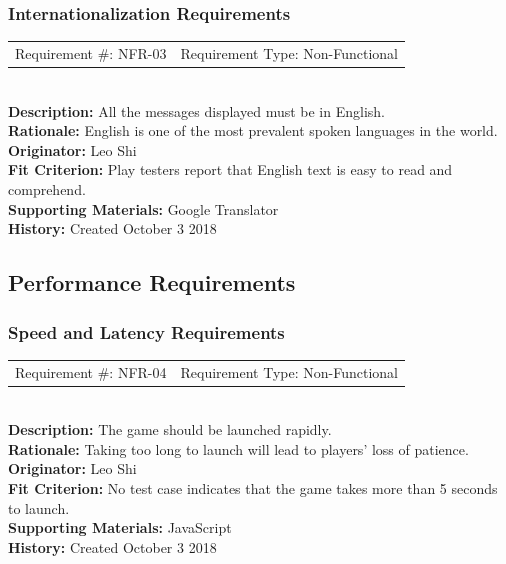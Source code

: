 \documentclass[12pt, titlepage]{article}
\begin{document}
\subsubsection{Internationalization Requirements}
\begin{reqbox}
	\begin{tabular}{cc}
		Requirement \#: NFR-03 & Requirement Type: Non-Functional \\
	\end{tabular} \\
	\textbf{Description:} All the messages displayed must be in English. \\
	\textbf{Rationale:}  English is one of the most prevalent spoken languages in the world.\\
	\textbf{Originator:} Leo Shi\\
	\textbf{Fit Criterion:} Play testers report that English text is easy to read and comprehend. \\
	\textbf{Supporting Materials:} Google Translator \\
	\textbf{History:} Created October 3 2018
\end{reqbox}

\subsection{Performance Requirements}

\subsubsection{Speed and Latency Requirements}
\begin{reqbox}
	\begin{tabular}{cc}
		Requirement \#: NFR-04 & Requirement Type: Non-Functional \\
	\end{tabular} \\
	\textbf{Description:} The game should be launched rapidly. \\
	\textbf{Rationale:}  Taking too long to launch will lead to players' loss of patience.\\
	\textbf{Originator:} Leo Shi\\
	\textbf{Fit Criterion:} No test case indicates that the game takes more than 5 seconds to launch.\\
	\textbf{Supporting Materials:} JavaScript \\
	\textbf{History:} Created October 3 2018
\end{reqbox}
\end{document}
